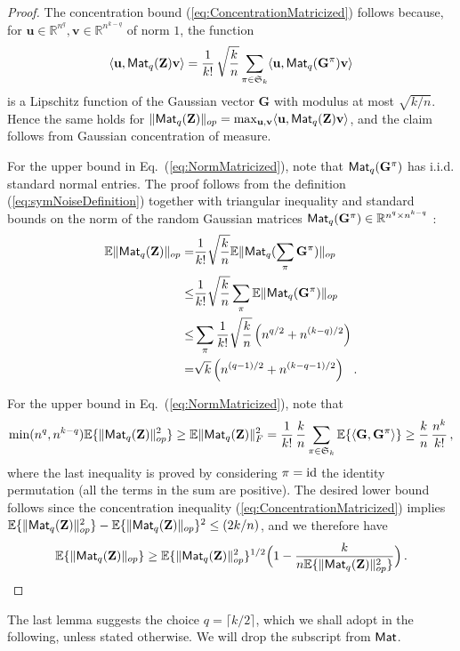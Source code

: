 \documentclass[11pt]{article}
\theoremstyle{definition}
\def\<{\langle}
\def\>{\rangle}
\def\E{{\mathbb E}} %
\def\reals{\mathbb{R}}
\def\bu{\mathbf{u}}
\def\bv{\mathbf{v}}
\def\bZ{\mathbf{Z}}
\def\bG{\mathbf{G}}
\def\E{\mathbb{E}}
\def\M{{\sf Mat}}
\begin{document}
\begin{proof}
The concentration bound (\ref{eq:ConcentrationMatricized}) follows because,
for $\bu\in\reals^{n^q}, \bv\in\reals^{n^{k-q}}$ of norm $1$, the function
%
\begin{align}
%
\<\bu,\M_q(\bZ) \bv\>= \frac{1}{k!}\,\sqrt{\frac{k}{n}}
\sum_{\pi \in \mathfrak S_k} \<\bu,\M_q(\bG^{\pi}) \bv\>
%
\end{align}
%
is a Lipschitz function of the Gaussian vector $\bG$ with modulus at
most $\sqrt{k/n}$. Hence the same holds for $\|\M_q(\bZ)\|_{op} =
\max_{\bu,\bv}\<\bu,\M_q(\bZ) \bv\>$,
and the claim follows from Gaussian concentration of measure. 

For the upper bound in Eq.~(\ref{eq:NormMatricized}), note that $\M_q(\bG^\pi)$ has i.i.d. standard normal entries.
The proof follows from the definition
(\ref{eq:symNoiseDefinition}) together with triangular inequality 
and standard bounds on  the norm of the random Gaussian matrices 
$\M_q(\bG^\pi) \in  \reals^{n^q \times n^{k-q}}$ \cite{Szarek:survey}: 
\begin{align*}
\E \|\M_q(\bZ)\|_{op}= &  \frac{1}{k!} \sqrt {\frac{k}{n}} \E \|\M_q( \sum_\pi \bG^\pi)\|_{op} \\
\leq & \frac{1}{k!} \sqrt {\frac{k}{n}} \sum_\pi   \E  \|\M_q(  \bG^\pi)\|_{op} \\
\leq & \sum_\pi   \frac{1}{k!} \sqrt {\frac{k}{n}} \left ( n^{q/2} + n^{(k-q)/2} \right )\\
 = & \sqrt k \left ( n^{(q-1)/2} + n^{(k-q-1)/2}  \right )~~.
\end{align*}

For the upper bound in Eq.~(\ref{eq:NormMatricized}), note that
%
\begin{align}
%
\min(n^{q},n^{k-q}) \E\{\|\M_q(\bZ)\|_{op}^2\} \ge \E \|\M_q(\bZ)\|_{F}^2 =
\frac{1}{k!}\,\frac{k}{n}
\sum_{\pi \in \mathfrak S_k}\E\{\<\bG,\bG^{\pi}\>\}\ge \frac{k}{n}\,
\frac{n^k}{k!}\, ,
%
\end{align}
%
where the last inequality is proved by considering $\pi = {\rm id}$
the identity permutation (all the terms in the sum are 
positive). The desired lower bound follows since the concentration
inequality (\ref{eq:ConcentrationMatricized}) implies 
$\E\{\|\M_q(\bZ)\|_{op}^2\}-\E\{\|\M_q(\bZ)\|_{op}\}^2\le (2k/n)$, and
we therefore have 
%
\begin{align}
%
\E\{\|\M_q(\bZ)\|_{op}\}\ge  \E\{\|\M_q(\bZ)\|_{op}^2\}^{1/2}\Big(1-
\frac{k}{n\E\{\|\M_q(\bZ)\|_{op}^2\}}\Big) \, .
%
\end{align}
%
\end{proof}
%
The last lemma suggests the choice $q=\lceil k/2\rceil$, which we
shall adopt in the following, unless stated otherwise. We will drop
the subscript from $\M$.
\end{document}
